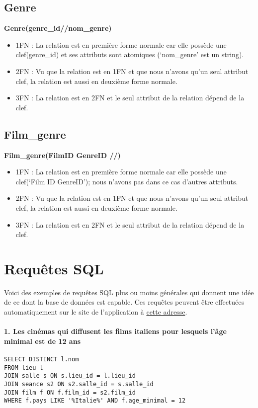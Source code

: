 \documentclass[12pt]{article}
\begin{document}
\subsection{Genre}
\textbf{Genre(genre{\_}id//nom{\_}genre)}
\begin{itemize}
    \item 1FN : La relation est en première forme normale car elle possède une clef(genre{\_}id) et ses attributs sont atomiques (‘nom{\_}genre’ est un string). 
    \item 2FN : Vu que la relation est en 1FN et que nous n'avons qu'un seul attribut clef, la relation est aussi
    en deuxième forme normale.
    \item 3FN : La relation est en 2FN et le seul attribut de la relation dépend de la clef.
\end{itemize}
\pagebreak
\subsection{Film{\_}genre}
\textbf{Film{\_}genre(FilmID GenreID //)}
\begin{itemize}
    \item 1FN : La relation est en première forme normale car elle possède une clef(‘Film ID GenreID’); nous n’avons pas dans ce cas d’autres attributs. 
    \item 2FN : Vu que la relation est en 1FN et que nous n'avons qu'un seul attribut clef, la relation est aussi
    en deuxième forme normale.
    \item 3FN : La relation est en 2FN et le seul attribut de la relation dépend de la clef.
\end{itemize}
\pagebreak
\section{Requêtes SQL}
Voici des exemples de requêtes SQL plus ou moins générales qui donnent une idée de ce dont la base de données est capable.
Ces requêtes peuvent être effectuées automatiquement sur le site de l'application à \href{https://bddg7unige.streamlit.app/SQL}{cette adresse}.
\paragraph*{1. Les cinémas qui diffusent les films italiens pour lesquels l'âge minimal est de 12 ans}
\begin{verbatim}
SELECT DISTINCT l.nom  
FROM lieu l 
JOIN salle s ON s.lieu_id = l.lieu_id  
JOIN seance s2 ON s2.salle_id = s.salle_id  
JOIN film f ON f.film_id = s2.film_id  
WHERE f.pays LIKE '%Italie%' AND f.age_minimal = 12 
\end{verbatim}
\end{document}
